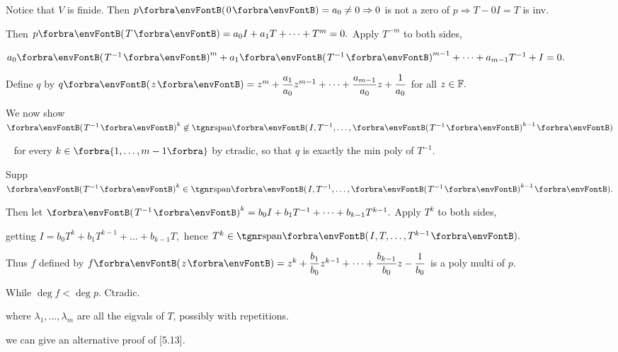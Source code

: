 \par\quad
Notice that $V$ is finide. Then $p\Par{0}=a_0\neq 0\Rightarrow 0$ is not a zero of $p\Rightarrow T-0I=T$ is inv.\par\quad
Then $p\Par{T}=a_0 I+a_1 T+\dots+T^m=0.$ Apply $T^{-m}$ to both sides,\par\quad
$a_0\Par{T^{-1}}^m+a_1\Par{T^{-1}}^{m-1}+\dots+a_{m-1}T^{-1}+I=0.$\par\quad
Define $q$ by $q\Par{z}=z^m+\Frac{a_1}{a_0} z^{m-1}+\dots+\Frac{a_{m-1}}{a_0}z+\Frac{1}{a_0}$ for all $z\in{\mathbb{F}}.$\par\vspace{6pt}\quad
We now show $\Par{T^{-1}}^k\not\in\Span{I,T^{-1},\dots,\Par{T^{-1}}^{k-1}}$\par\qquad\qquad\qquad\,\,\,
for every $k\in\Bra{1,\dots,m-1}$ by ctradic, so that $q$ is exactly the min poly of $T^{-1}.$\par\quad
Supp $\Par{T^{-1}}^k\in\Span{I,T^{-1},\dots,\Par{T^{-1}}^{k-1}}.$\par\quad
Then let $\Par{T^{-1}}^k=b_0 I+b_1 T^{-1}+\dots+b_{k-1}T^{k-1}.$ Apply $T^k$ to both sides,\par\qquad\qquad
 getting $I=b_0 T^k+b_1 T^{k-1}+\dots+b_{k-1}T,$ hence $T^k\in\Span{I,T,\dots,T^{k-1}}.$\par\vspace{6pt}\quad
Thus $f$ defined by $f\Par{z}=z^k+\Frac{b_1}{b_0} z^{k-1}+\dots+\Frac{b_{k-1}}{b_0} z-\Frac{1}{b_0}$ is a poly multi of $p$.\par\quad
While $\deg f<\deg p.$ Ctradic.\PfEnd
\SepLine

\BulletPointX\NoteForSmall{[8.49]}\TextB{}
{\tgsl\large where $\lambda_1,\dots,\lambda_m$ are all the eigvals of $T$, {\tgsc possibly with repetitions}.}\par
\BulletPointX\Comment\TextB{}
we can {\tgsc give an alternative proof of [5.13]}.
\SepLine

